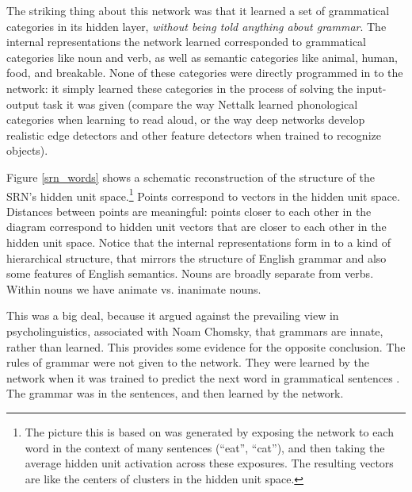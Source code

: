 The striking thing about this network was that it learned a set of grammatical categories in its hidden layer, \emph{without being told anything about grammar}. The internal representations the network learned corresponded to grammatical categories like noun and verb, as well as semantic categories like animal, human, food, and breakable. None of these categories were directly programmed in to the network: it simply learned these categories in the process of solving the input-output task it was given (compare the way Nettalk learned phonological categories when learning to read aloud, or the way deep networks develop realistic edge detectors and other feature detectors when trained to recognize objects). 

Figure \ref{srn_words} shows a schematic reconstruction of the structure of the SRN's hidden unit space.\footnote{The picture this is based on was generated by exposing the network to each word in the context of many sentences (\eg ``eat'', ``cat''), and then taking the average hidden unit activation across these exposures. The resulting vectors are like the centers of clusters in the hidden unit space.} Points correspond to vectors in the hidden unit space. Distances between points are meaningful: points closer to each other in the diagram correspond to hidden unit vectors that are closer to each other in the hidden unit space. Notice that the internal representations form in to a kind of hierarchical structure, that mirrors the structure of English grammar and also some features of English semantics. Nouns are broadly separate from verbs. Within nouns we have animate vs. inanimate nouns. 

This  was a big deal, because it argued against the prevailing view in psycholinguistics, associated with Noam Chomsky,  that  grammars are innate, rather than learned. This provides some evidence for the opposite conclusion. The rules of grammar were not given to the network. They were learned by the network when it was trained to predict the next word in grammatical sentences \cite{elman1990finding}. The grammar was in the sentences, and then learned by the network.

